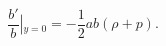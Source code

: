 \begin{equation}\label{junc2}
\frac{b'}{b}\left|_{y=0} \right. = -\frac{1}{2}ab (\rho+p).
\end{equation}


